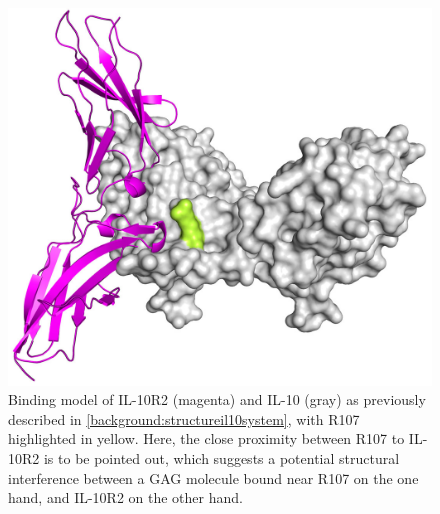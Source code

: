 \begin{figure}
\centering
\includegraphics[width=1.0\textwidth]{gfx/together/il10dimer_surface_r2cartoon_r107_01.jpg}
\caption[]{
Binding model of IL-10R2 (magenta) and IL-10 (gray) as previously described in
\cref{background:structureil10system}, with R107 highlighted in yellow. Here,
the close proximity between R107 to IL-10R2 is to be pointed out, which suggests
a potential structural interference between a GAG molecule bound near R107 on
the one hand, and IL-10R2 on the other hand.}
\label{fig:together:r2impaired}
\end{figure}
